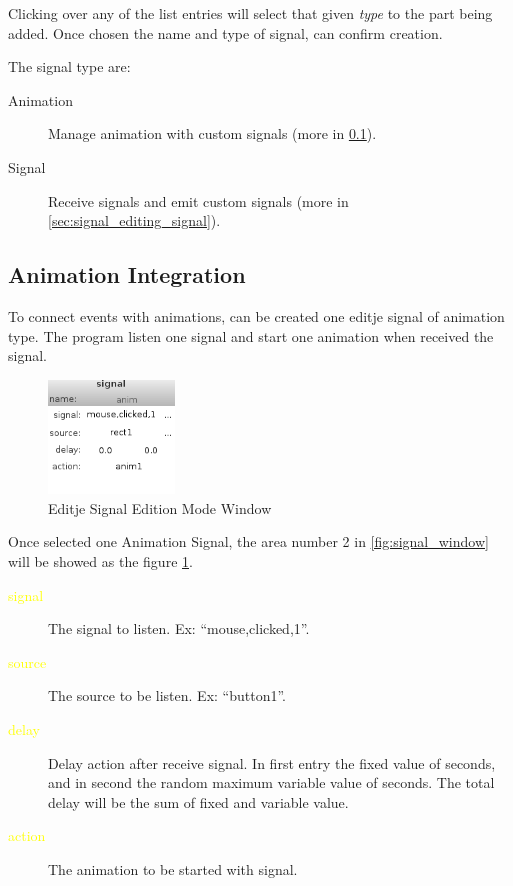 \documentclass[a4paper]{profusion}
\newcommand{\GUIEditable}[1]{\textcolor{yellow}{#1}} %
\begin{document}
Clicking over any of the list entries will select that given
\emph{type} to the part being added. Once chosen the name and type of
signal, can confirm creation.

The signal type are:
\begin{description}
 \item[Animation] Manage animation with custom signals (more in
   \ref{sec:signal_editing_animation}).
 \item[Signal] Receive signals and emit custom signals (more in
   \ref{sec:signal_editing_signal}).
\end{description}

\subsection{Animation Integration}
\label{sec:signal_editing_animation}

To connect events with animations, can be created one editje signal of
animation type. The program listen one signal and start one animation
when received the signal.

\begin{figure}
 \centering
 \includegraphics[width=0.3\textwidth]{./images/signal_anim.png}
 \caption{Editje Signal Edition Mode Window}
 \label{fig:signal_animation_config}
\end{figure}

Once selected one Animation Signal, the area number 2 in
\ref{fig:signal_window} will be showed as the figure
\ref{fig:signal_animation_config}.

\begin{description}
 \item[\GUIEditable{signal}] The signal to listen. Ex:
   ``mouse,clicked,1''.
 \item[\GUIEditable{source}] The source to be listen. Ex: ``button1''.
 \item[\GUIEditable{delay}] Delay action after receive signal. In
   first entry the fixed value of seconds, and in second the random
   maximum variable value of seconds.  The total delay will be the sum
   of fixed and variable value.
 \item[\GUIEditable{action}] The animation to be started with signal.
\end{description}
\end{document}
